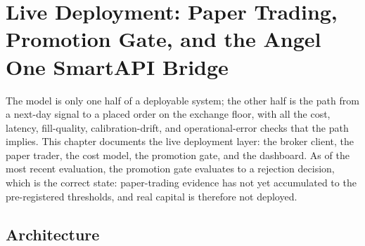 \chapter{Live Deployment: Paper Trading, Promotion Gate, and the Angel One SmartAPI Bridge} \label{chapter5}

The model is only one half of a deployable system; the other half is the path from a next-day signal to a placed order on the exchange floor, with all the cost, latency, fill-quality, calibration-drift, and operational-error checks that the path implies. This chapter documents the live deployment layer: the broker client, the paper trader, the cost model, the promotion gate, and the dashboard. As of the most recent evaluation, the promotion gate evaluates to a rejection decision, which is the correct state: paper-trading evidence has not yet accumulated to the pre-registered thresholds, and real capital is therefore not deployed.

\section{Architecture}

